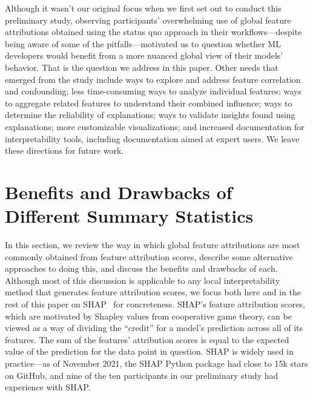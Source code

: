 \documentclass[11pt,dvipdfmx]{article}
\begin{document}
Although it wasn't our original focus when we first set out to conduct
this preliminary study, observing participants' overwhelming use of
global feature attributions obtained using the status quo approach in their
workflows---despite being aware of some of the pitfalls---motivated us
to question whether ML developers would benefit from a more nuanced
global view of their models' behavior. That is the question we address
in this paper. Other needs that emerged from the study include ways to
explore and address feature correlation and confounding; less
time-consuming ways to analyze individual features; ways to aggregate
related features to understand their combined influence; ways to
determine the reliability of explanations; ways to validate insights
found using explanations; more customizable visualizations; and
increased documentation for interpretability tools, including
documentation aimed at expert users. We leave these directions for
future work. 





\section{Benefits and Drawbacks of Different Summary Statistics}
\label{sec:background}


In this section, we review the way in which global feature attributions are
most commonly obtained from feature attribution scores, describe some
alternative approaches to doing this, and discuss the benefits and
drawbacks of each. Although most of this discussion is applicable to
any local interpretability method that generates feature attribution
scores, we focus both here and in the rest of this paper on
SHAP~\citep{SHAP} for concreteness.  SHAP's feature attribution
scores, which are motivated by Shapley values from cooperative game
theory, can be viewed as a way of dividing the ``credit'' for a
model's prediction across all of its features.  The sum of the
features' attribution scores is equal to the expected value of the
prediction for the data point in question.  SHAP is widely used in
practice---as of November 2021, the SHAP Python package had close to
15k stars on GitHub, and nine of the ten participants in our
preliminary study had experience with SHAP.
\end{document}
